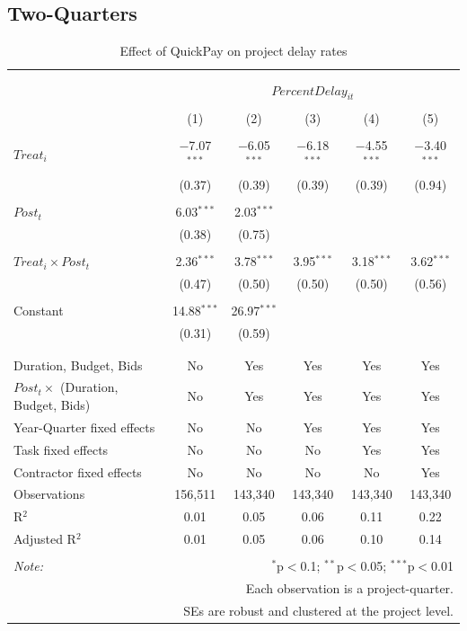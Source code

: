 \documentclass[
]{article}
\begin{document}
\hypertarget{two-quarters}{%
\subsection{Two-Quarters}\label{two-quarters}}

\begin{table}[H] \centering 
  \caption{Effect of QuickPay on project delay rates} 
  \label{} 
\small 
\begin{tabular}{@{\extracolsep{-2pt}}lccccc} 
\\[-1.8ex]\hline 
\hline \\[-1.8ex] 
\\[-1.8ex] & \multicolumn{5}{c}{$PercentDelay_{it}$} \\ 
\\[-1.8ex] & (1) & (2) & (3) & (4) & (5)\\ 
\hline \\[-1.8ex] 
 $Treat_i$ & $-$7.07$^{***}$ & $-$6.05$^{***}$ & $-$6.18$^{***}$ & $-$4.55$^{***}$ & $-$3.40$^{***}$ \\ 
  & (0.37) & (0.39) & (0.39) & (0.39) & (0.94) \\ 
  & & & & & \\ 
 $Post_t$ & 6.03$^{***}$ & 2.03$^{***}$ &  &  &  \\ 
  & (0.38) & (0.75) &  &  &  \\ 
  & & & & & \\ 
 $Treat_i \times Post_t$ & 2.36$^{***}$ & 3.78$^{***}$ & 3.95$^{***}$ & 3.18$^{***}$ & 3.62$^{***}$ \\ 
  & (0.47) & (0.50) & (0.50) & (0.50) & (0.56) \\ 
  & & & & & \\ 
 Constant & 14.88$^{***}$ & 26.97$^{***}$ &  &  &  \\ 
  & (0.31) & (0.59) &  &  &  \\ 
  & & & & & \\ 
\hline \\[-1.8ex] 
Duration, Budget, Bids & No & Yes & Yes & Yes & Yes \\ 
$Post_t \times$  (Duration, Budget, Bids) & No & Yes & Yes & Yes & Yes \\ 
Year-Quarter fixed effects & No & No & Yes & Yes & Yes \\ 
Task fixed effects & No & No & No & Yes & Yes \\ 
Contractor fixed effects & No & No & No & No & Yes \\ 
Observations & 156,511 & 143,340 & 143,340 & 143,340 & 143,340 \\ 
R$^{2}$ & 0.01 & 0.05 & 0.06 & 0.11 & 0.22 \\ 
Adjusted R$^{2}$ & 0.01 & 0.05 & 0.06 & 0.10 & 0.14 \\ 
\hline 
\hline \\[-1.8ex] 
\textit{Note:}  & \multicolumn{5}{r}{$^{*}$p$<$0.1; $^{**}$p$<$0.05; $^{***}$p$<$0.01} \\ 
 & \multicolumn{5}{r}{Each observation is a project-quarter.} \\ 
 & \multicolumn{5}{r}{SEs are robust and clustered at the project level.} \\ 
\end{tabular} 
\end{table}
\end{document}
